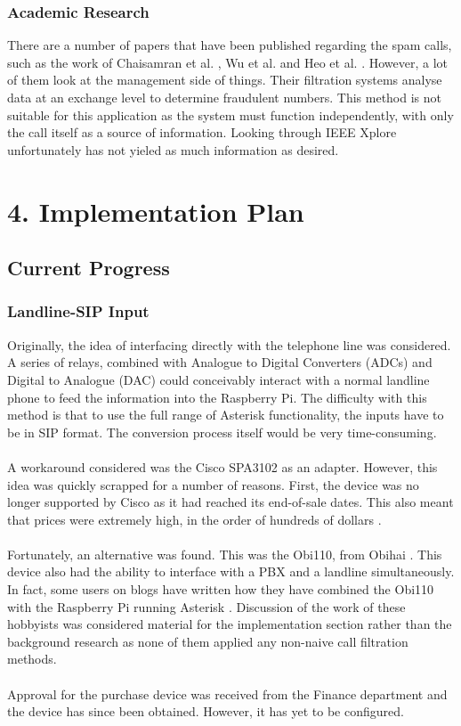 \documentclass[12pt,a4paper]{report}
\newcommand{\mychapter}[2]
{
    \setcounter{chapter}{#1}
    \setcounter{section}{0}
    \chapter*{#2}
    \addcontentsline{toc}{chapter}{#2}
}
\begin{document}
\subsection{Academic Research}
There are a number of papers that have been published regarding the spam calls, such as the work of Chaisamran et al. \cite{chaisa}, Wu et al. \cite{wu} and Heo et al. \cite{heo}. However, a lot of them look at the management side of things. Their filtration systems analyse data at an exchange level to determine fraudulent numbers. This method is not suitable for this application as the system must function independently, with only the call itself as a source of information. Looking through IEEE Xplore unfortunately has not yieled as much information as desired.

\newpage
\mychapter{4}{4. Implementation Plan}
\section{Current Progress}
\subsection{Landline-SIP Input}
Originally, the idea of interfacing directly with the telephone line was considered. A series of relays, combined with Analogue to Digital Converters (ADCs) and Digital to Analogue (DAC) could conceivably interact with a normal landline phone to feed the information into the Raspberry Pi. The difficulty with this method is that to use the full range of Asterisk functionality, the inputs have to be in SIP format. The conversion process itself would be very time-consuming.
\\\\
A workaround considered was the Cisco SPA3102 \cite{spa3102-specs} as an adapter. However, this idea was quickly scrapped for a number of reasons. First, the device was no longer supported by Cisco as it had reached its end-of-sale dates. This also meant that prices were extremely high, in the order of hundreds of dollars \cite{spa3102-amazon}.
\\\\
Fortunately, an alternative was found. This was the Obi110, from Obihai \cite{obi110-specs}. This device also had the ability to interface with a PBX and a landline simultaneously. In fact, some users on blogs have written how they have combined the Obi110 with the Raspberry Pi running Asterisk \cite{freepbx} \cite{bryanross}. Discussion of the work of these hobbyists was considered material for the implementation section rather than the background research as none of them applied any non-naive call filtration methods.
\\\\
Approval for the purchase device was received from the Finance department and the device has since been obtained. However, it has yet to be configured.
\end{document}
